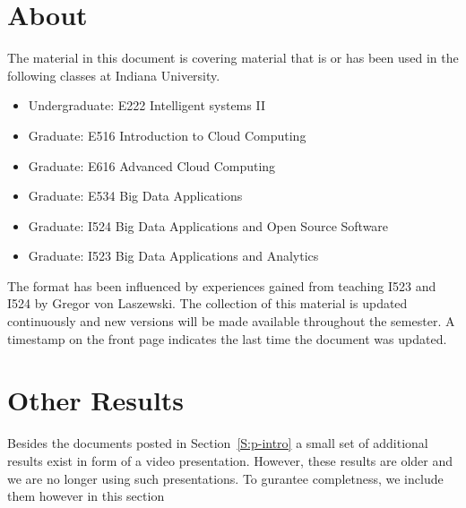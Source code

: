 \section{About}

The material in this document is covering material that is or has been
used in the following classes at Indiana University.

\begin{itemize}
\item Undergraduate: E222 Intelligent systems II
\item Graduate: E516 Introduction to Cloud Computing
\item Graduate: E616 Advanced Cloud Computing
\item Graduate: E534 Big Data Applications
\item Graduate: I524 Big Data Applications and Open Source Software
\item Graduate: I523 Big Data Applications and Analytics
\end{itemize}

The format has been influenced by experiences gained from teaching I523
and I524 by Gregor von Laszewski.  The collection of this material is
updated continuously and new versions will be made available
throughout the semester. A timestamp on the front page indicates the
last time the document was updated.

\section{Other Results}\label{S:results}

Besides the documents posted in Section~\ref{S:p-intro} a small set of
additional results exist in form of a video presentation.  However,
these results are older and we are no longer using such
presentations. To gurantee completness, we include them however in
this section







